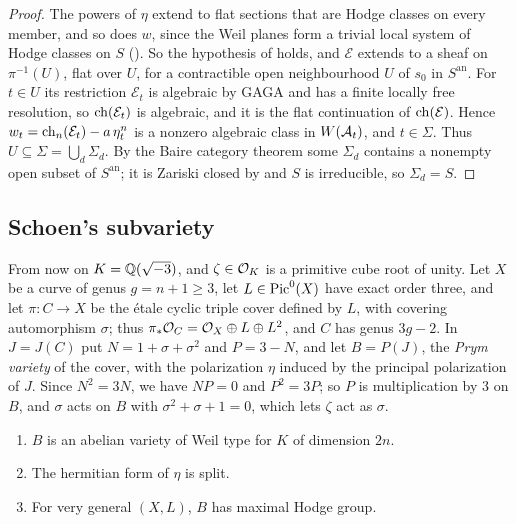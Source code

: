 \begin{proof}
The powers of $\eta$ extend to flat sections that are Hodge classes on every
member, and so does $w$, since the Weil planes form a trivial local system
of Hodge classes on $S$ (). So the hypothesis of
 holds, and $\mathcal{E}$ extends to a sheaf on
$\pi^{-1}(U)$, flat over $U$, for a contractible open neighbourhood $U$ of
$s_{0}$ in $S^{\mathrm{an}}$. For $t\in U$ its restriction $\mathcal{E}_{t}$
is algebraic by GAGA and has a finite locally free resolution, so
$\operatorname{ch}(\mathcal{E}_{t})$ is algebraic, and it is the flat continuation of
$\operatorname{ch}(\mathcal{E})$. Hence $w_{t}=\operatorname{ch}_{n}(\mathcal{E}_{t})-a\,\eta_{t}^{n}$ is
a nonzero algebraic class in $W(\mathcal{A}_{t})$, and $t\in\Sigma$. Thus
$U\subseteq\Sigma=\bigcup_{d}\Sigma_{d}$. By the Baire category theorem some
$\Sigma_{d}$ contains a nonempty open subset of $S^{\mathrm{an}}$; it is
Zariski closed by  and $S$ is irreducible, so
$\Sigma_{d}=S$.
\end{proof}

\subsection{Schoen's subvariety}\label{ssec:schoen}
From now on $K=\mathbb{Q}(\sqrt{-3})$, and $\zeta\in\mathcal{O}_{K}$ is a primitive cube
root of unity. Let $X$ be a curve of genus $g=n+1\ge3$, let $L\in
\operatorname{Pic}^{0}(X)$ have exact order three, and let $\pi\colon C\to X$ be the
\'etale cyclic triple cover defined by $L$, with covering automorphism
$\sigma$; thus $\pi_{*}\mathcal{O}_{C}=\mathcal{O}_{X}\oplus L\oplus L^{2}$, and $C$ has
genus $3g-2$. In $J=J(C)$ put $N=1+\sigma+\sigma^{2}$ and $P=3-N$, and let
$B=P(J)$, the \emph{Prym variety} of the cover, with the polarization $\eta$
induced by the principal polarization of $J$. Since $N^{2}=3N$, we have
$NP=0$ and $P^{2}=3P$; so $P$ is multiplication by $3$ on $B$, and $\sigma$
acts on $B$ with $\sigma^{2}+\sigma+1=0$, which lets $\zeta$ act as $\sigma$.

\begin{lemma}\label{lem:prym}
\begin{enumerate}[label=\textup{(\alph*)}]
\item $B$ is an abelian variety of Weil type for $K$ of dimension $2n$.
\item The hermitian form of $\eta$ is split.
\item For very general $(X,L)$, $B$ has maximal Hodge group.
\end{enumerate}
\end{lemma}

